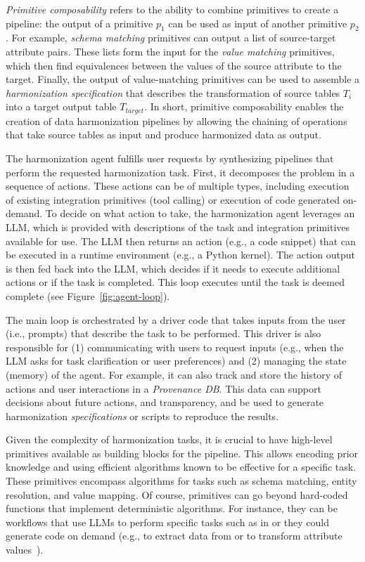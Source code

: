 \textit{Primitive composability} refers to the ability to combine primitives to create a pipeline: the output of a primitive $p_1$ can be used as input of another primitive $p_2$. For example, \textit{schema matching} primitives can output a list of source-target attribute pairs.
These lists form the input for the \textit{value matching} primitives, which then find equivalences between the values of the source attribute to the target. Finally, the output of value-matching primitives can be used to assemble a \textit{harmonization specification} that describes the transformation of source tables $T_i$ into a target output table $T_{target}$.
% 
In short, primitive composability enables the creation of data harmonization pipelines by allowing the chaining of operations that take source tables as input and produce harmonized data as output.

The harmonization agent fulfills user requests by synthesizing pipelines that perform the requested harmonization task. 
First, it decomposes the problem in a sequence of actions. These actions can be of multiple types, including execution of existing integration primitives (tool calling) or execution of code generated on-demand. 
To decide on what action to take, the harmonization agent leverages an LLM, which is provided with descriptions of the task and integration primitives available for use. 
The LLM then returns an action (e.g., a code snippet) that can be executed in a runtime environment (e.g., a Python kernel). The action output is then fed back into the LLM, which decides if it needs to execute additional actions or if the task is completed.
This loop executes until the task is deemed complete (see Figure~\ref{fig:agent-loop}).

The main loop is orchestrated by a driver code that takes inputs from the user (i.e., prompts) that describe the task to be performed. 
This driver is also responsible for (1) communicating with users to request inputs (e.g., when the LLM asks for task clarification or user preferences) and (2) managing the state (memory) of the agent. For example, it can also track and store the history of actions and user interactions in a \textit{Provenance DB}.
This data can support decisions about future actions, and transparency, and be used to generate harmonization \textit{specifications} or scripts to reproduce the results.

Given the complexity of harmonization tasks, it is crucial to have high-level primitives available as building blocks for the pipeline.
This allows encoding prior knowledge and using efficient algorithms known to be effective for a specific task.
These primitives encompass algorithms for tasks such as schema matching, entity resolution, and value mapping. Of course, primitives can go beyond hard-coded functions that implement deterministic algorithms. For instance, they can be workflows that use LLMs to perform specific tasks such as in \cite{liu2024magneto} or they could generate code on demand (e.g., to extract data from or to transform attribute values~\cite{autoformula2024}). 


